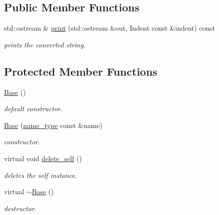 \subsection*{Public Member Functions}
\begin{DoxyCompactItemize}
\item 
\hypertarget{classhryky_1_1log_1_1format_1_1_base_a9036ce4ca367b322c9f41365ee249cb1}{std\-::ostream \& \hyperlink{classhryky_1_1log_1_1format_1_1_base_a9036ce4ca367b322c9f41365ee249cb1}{print} (std\-::ostream \&out, Indent const \&indent) const }\label{classhryky_1_1log_1_1format_1_1_base_a9036ce4ca367b322c9f41365ee249cb1}

\begin{DoxyCompactList}\small\item\em prints the converted string. \end{DoxyCompactList}\end{DoxyCompactItemize}
\subsection*{Protected Member Functions}
\begin{DoxyCompactItemize}
\item 
\hypertarget{classhryky_1_1log_1_1format_1_1_base_a19356ccdd96c0bd9d57f7f3b38296ebc}{\hyperlink{classhryky_1_1log_1_1format_1_1_base_a19356ccdd96c0bd9d57f7f3b38296ebc}{Base} ()}\label{classhryky_1_1log_1_1format_1_1_base_a19356ccdd96c0bd9d57f7f3b38296ebc}

\begin{DoxyCompactList}\small\item\em default constructor. \end{DoxyCompactList}\item 
\hypertarget{classhryky_1_1log_1_1format_1_1_base_ac38daae96c8bf0d79f60d5aa8173e7fb}{\hyperlink{classhryky_1_1log_1_1format_1_1_base_ac38daae96c8bf0d79f60d5aa8173e7fb}{Base} (\hyperlink{namespacehryky_1_1log_1_1format_ab7408d1e2ed2d648dbf9bba69eb74288}{name\-\_\-type} const \&name)}\label{classhryky_1_1log_1_1format_1_1_base_ac38daae96c8bf0d79f60d5aa8173e7fb}

\begin{DoxyCompactList}\small\item\em constructor. \end{DoxyCompactList}\item 
virtual void \hyperlink{classhryky_1_1log_1_1format_1_1_base_af1f3f2984f1a130ca7fd927c62d73ac0}{delete\-\_\-self} ()
\begin{DoxyCompactList}\small\item\em deletes the self instance. \end{DoxyCompactList}\item 
\hypertarget{classhryky_1_1log_1_1format_1_1_base_a7c0d161f6e0b177e9d04dd04f8f5353f}{virtual \hyperlink{classhryky_1_1log_1_1format_1_1_base_a7c0d161f6e0b177e9d04dd04f8f5353f}{$\sim$\-Base} ()}\label{classhryky_1_1log_1_1format_1_1_base_a7c0d161f6e0b177e9d04dd04f8f5353f}

\begin{DoxyCompactList}\small\item\em destructor. \end{DoxyCompactList}\end{DoxyCompactItemize}
